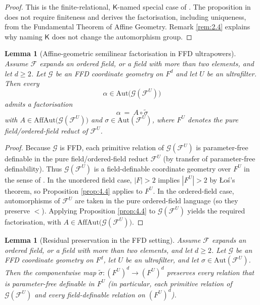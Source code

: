 \documentclass[11pt,a4paper]{article}
\newcommand{\G}{\mathcal{G}}
\newcommand{\F}{\mathcal{F}}
\newtheorem{lemma}[theorem]{Lemma}
\theoremstyle{definition}
\begin{document}
\begin{proof}
This is the finite-relational, $\mathsf K$-named special
case of \cite[Proposition~6.1]{MSS26}. The proposition in \cite{MSS26}
does not require finiteness and derives the factorisation, including
uniqueness, from the Fundamental Theorem of Affine Geometry. Remark \ref{rem:2.4}
explains why naming $\mathsf K$ does not change the automorphism
group.
\end{proof}


\begin{lemma}[Affine-geometric semilinear factorisation in
	FFD ultrapowers]
	\label{lem:4.5}
Assume $\F$ expands an
ordered field, or a field with more than two elements, and let $d\ge 2$. Let $\G$
be an FFD coordinate geometry on $F^d$ and let $U$ be an
ultrafilter. Then every 
\[
\alpha\in \mathrm{Aut}\big(\G(\F^U)\big)
\] admits a factorisation \[
\alpha\ =\ A\circ \widetilde\sigma
\] with $A\in\mathrm{AffAut}\big(\G(\F^U)\big)$ and
$\sigma\in\mathrm{Aut}(\F^U)$, where $F^U$ denotes the pure
field/ordered-field reduct of $\F^U$.
\end{lemma}

\begin{proof}
	Because $\G$ is FFD, each primitive relation of
$\G(\F^U)$ is parameter-free definable in the pure
field/ordered-field reduct $\F^U$ (by transfer of parameter-free
definability). Thus $\G(\F^U)$ is a field-definable coordinate
geometry over $F^U$ in the sense of \cite{MSS26}. In the
unordered field case, $|F|>2$ implies $|F^U|>2$ by Łoś's theorem, so
Proposition \ref{prop:4.4} applies to $F^U$. In the ordered-field case,
automorphisms of $\F^U$ are taken in the pure ordered-field language
(so they preserve $<$). Applying Proposition \ref{prop:4.4} to
$\G(\F^U)$ yields the required factorisation, with
$A\in\mathrm{AffAut}\big(\G(\F^U)\big)$.
\end{proof}


\begin{lemma}[Residual preservation in the FFD setting]
	\label{lem:4.6}
Assume
$\F$ expands an ordered field, or a field with more than two elements, and
let $d\ge 2$. Let $\G$ be an FFD coordinate geometry on $F^d$, let
$U$ be an ultrafilter, and let $\sigma\in\mathrm{Aut}(\F^U)$. Then
the componentwise map $\widetilde\sigma:(F^U)^d\to(F^U)^d$ preserves
every relation that is parameter-free definable in $F^U$ (in
particular, each primitive relation of $\G(\F^U)$ and every
field-definable relation on $(F^U)^d$).
\end{lemma}
\end{document}
